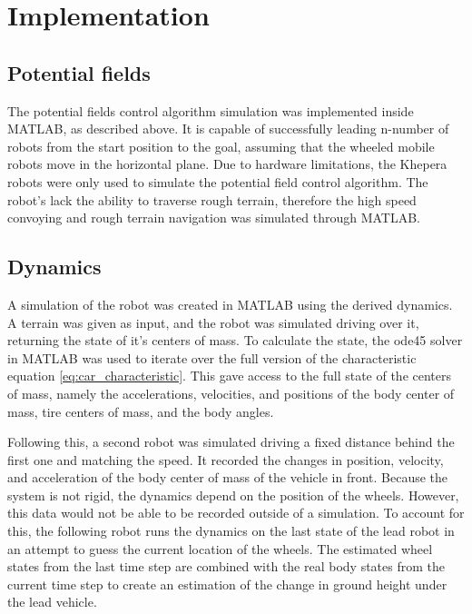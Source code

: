 \chapter{Implementation}
\section{Potential fields}
The potential fields control algorithm simulation was implemented inside MATLAB, as described above. It is capable of successfully leading n-number of robots from the start position to the goal, assuming that the wheeled mobile robots move in the horizontal plane. Due to hardware limitations, the Khepera robots were only used to simulate the potential field control algorithm. The robot's lack the ability to traverse rough terrain, therefore the high speed convoying and rough terrain navigation was simulated through MATLAB.

\section{Dynamics}
A simulation of the robot was created in MATLAB using the derived dynamics. A terrain was given as input, and the robot was simulated driving over it, returning the state of it's centers of mass. To calculate the state, the ode45 solver in MATLAB was used to iterate over the full version of the characteristic equation \eqref{eq:car_characteristic}. This gave access to the full state of the centers of mass, namely the accelerations, velocities, and positions of the body center of mass, tire centers of mass, and the body angles.

Following this, a second robot was simulated driving a fixed distance behind the first one and matching the speed. It recorded the changes in position, velocity, and acceleration of the body center of mass of the vehicle in front. Because the system is not rigid, the dynamics depend on the position of the wheels. However, this data would not be able to be recorded outside of a simulation. To account for this, the following robot runs the dynamics on the last state of the lead robot in an attempt to guess the current location of the wheels. The estimated wheel states from the last time step are combined with the real body states from the current time step to create an estimation of the change in ground height under the lead vehicle.

